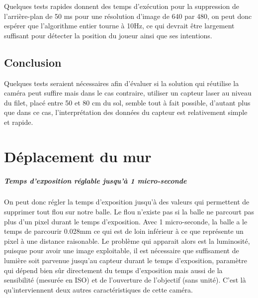 Quelques tests rapides donnent des temps d'exécution pour la suppression de l'arrière-plan de 50 ms pour une résolution d'image de 640 par 480, on peut donc espérer que l'algorithme entier tourne à 10Hz, ce qui devrait être largement suffisant pour détecter la position du joueur ainsi que ses intentions. 


\section{Conclusion}

Quelques tests seraient nécessaires afin d'évaluer si la solution qui réutilise la caméra peut suffire mais dans le cas contraire, utiliser un capteur laser au niveau du filet, placé entre 50 et 80 cm du sol, semble tout à fait possible, d'autant plus que dans ce cas, l'interprétation des données du capteur est relativement simple et rapide. 

















\chapter{Déplacement du mur}



\paragraph{Temps d'exposition réglable jusqu'à 1 micro-seconde\\}

On peut donc régler la temps d'exposition jusqu'à des valeurs qui permettent de supprimer tout flou sur notre balle. Le flou n'existe pas si la balle ne parcourt pas plus d'un pixel durant le temps d'exposition. Avec 1 micro-seconde, la balle a le temps de parcourir 0.028mm ce qui est de loin inférieur à ce que représente un pixel à une distance raisonable. Le problème qui apparait alors est la luminosité, puisque pour avoir une image exploitable, il est nécessaire que suffisament de lumière soit parvenue jusqu'au capteur durant le temps d'exposition, paramètre qui dépend bien sûr directement du temps d'exposition mais aussi de la sensibilité (mesurée en ISO) et de l'ouverture de l'objectif (sans unité). C'est là qu'interviennent deux autres caractéristiques de cette caméra. 

